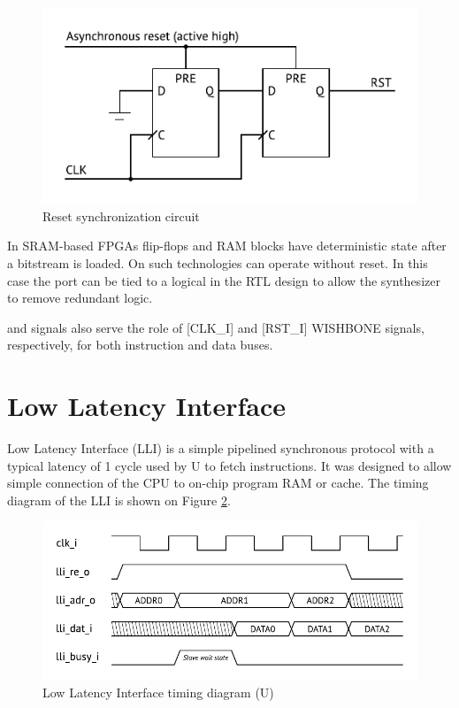 \documentclass[a4paper,12pt,twoside,extrafontsizes]{memoir}
\begin{document}
\begin{figure}[htbp]
	\centering
	\includegraphics[scale=1]{images/resetsync.pdf}
	\caption{Reset synchronization circuit}
	\label{fig:resetsync}
\end{figure}

In SRAM-based FPGAs flip-flops and RAM blocks have deterministic state after a bitstream is loaded. On such technologies \lxp{} can operate without reset. In this case the  port can be tied to a logical  in the RTL design to allow the synthesizer to remove redundant logic.

 and  signals also serve the role of [CLK\_I] and [RST\_I] WISHBONE signals, respectively, for both instruction and data buses.

\section{Low Latency Interface}
\label{sec:lli}

Low Latency Interface (LLI) is a simple pipelined synchronous protocol with a typical latency of 1 cycle used by \lxp{}U to fetch instructions. It was designed to allow simple connection of the CPU to on-chip program RAM or cache. The timing diagram of the LLI is shown on Figure \ref{fig:llitiming}.

\begin{figure}[htbp]
	\centering
	\includegraphics[scale=1]{images/llitiming.pdf}
	\caption{Low Latency Interface timing diagram (\lxp{}U)}
	\label{fig:llitiming}
\end{figure}
\end{document}
